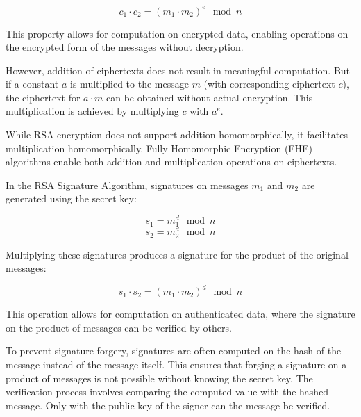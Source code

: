 \documentclass[11pt]{article}
\begin{document}
\[ c_1 \cdot c_2 = (m_1 \cdot m_2)^e \mod n \]

This property allows for computation on encrypted data, enabling operations on the encrypted form of the messages without decryption.

However, addition of ciphertexts does not result in meaningful computation. But if a constant \( a \) is multiplied to the message \( m \) (with corresponding ciphertext \( c \)), the ciphertext for \( a \cdot m \) can be obtained without actual encryption. This multiplication is achieved by multiplying \( c \) with \( a^e \).

While RSA encryption does not support addition homomorphically, it facilitates multiplication homomorphically. Fully Homomorphic Encryption (FHE) algorithms enable both addition and multiplication operations on ciphertexts.

In the RSA Signature Algorithm, signatures on messages \( m_1 \) and \( m_2 \) are generated using the secret key:

\[ s_1 = m_1^d \mod n \]
\[ s_2 = m_2^d \mod n \]

Multiplying these signatures produces a signature for the product of the original messages:

\[ s_1 \cdot s_2 = (m_1 \cdot m_2)^d \mod n \]

This operation allows for computation on authenticated data, where the signature on the product of messages can be verified by others.

To prevent signature forgery, signatures are often computed on the hash of the message instead of the message itself. This ensures that forging a signature on a product of messages is not possible without knowing the secret key. The verification process involves comparing the computed value with the hashed message. Only with the public key of the signer can the message be verified.
\newline
\end{document}
